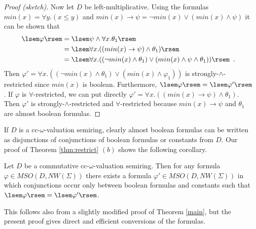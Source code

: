 \documentclass[runningheads, envcountsame, a4paper]{llncs}
\begin{document}
\begin{proof}[Proof (sketch)]
Now let $D$ be left-multiplicative.
Using the formulas $min(x) = \forall y. ( x \leq y)$ and $min(x) \rightarrow \psi = \neg min(x) \vee (min(x) \wedge \psi)$ it can be shown that
\begin{align*} \lsem \varphi \rsem &= \lsem \psi \wedge \forall x.\theta_1\rsem \\
	&= \lsem \forall x.((min(x) \rightarrow \psi) \wedge \theta_1)\rsem\\
	&= \lsem \forall x.((\neg min(x) \wedge \theta_1) \vee (min(x) \wedge \psi \wedge \theta_1)) \rsem \enspace.
\end{align*}
Then $\varphi'=\forall x.((\neg min(x) \wedge \theta_1) \vee (min(x) \wedge \varphi_1))$ is strongly-$\wedge$-restricted since $min(x)$ is boolean. Furthermore,
$\lsem \varphi \rsem=\lsem \varphi' \rsem$.
If $\varphi$ is $\forall$-restricted, we can put directly $\varphi'=\forall x.((min(x) \rightarrow \psi) \wedge \theta_1)$. Then $\varphi'$ is strongly-$\wedge$-restricted and $\forall$-restricted because $min(x) \rightarrow \psi$ and $\theta_1$ are almost boolean formulas.
\end{proof}
If $D$ is a cc-$\omega$-valuation semiring, clearly
 almost boolean formulas can be written as disjunctions
 of conjunctions of boolean formulas or constants from $D$.
 Our proof of Theorem \ref{thm:restrict} $(b)$ shows the following corollary.
\begin{Folgerung}
 Let $D$ be a commutative cc-$\omega$-valuation semiring.
 Then for any formula $\varphi \in \mathit{MSO}(D, \mathit{NW}(\Sigma))$ there exists a formula $\varphi' \in \mathit{MSO}(D, \mathit{NW}(\Sigma))$ in which conjunctions occur
 only between boolean formulas and constants such that $\lsem \varphi \rsem =\lsem \varphi'\rsem$.
\end{Folgerung}
 This follows also from a slightly modified proof of Theorem \ref{main},
 but the present proof gives direct and efficient
 conversions of the formulas.
\end{document}

